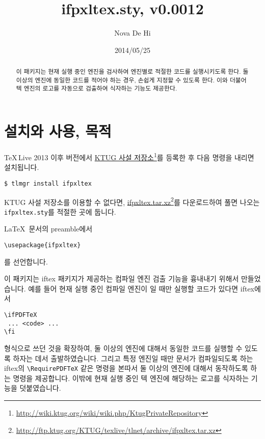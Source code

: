 \documentclass[b5paper,adjustmath,nanum]{oblivoir}
\begin{document}
\title{ifpxltex.sty, v0.0012}
\author{Nova De Hi}
\date{2014/05/25}

\maketitle

\begin{abstract}
이 패키지는 현재 실행 중인 
엔진을 검사하여 엔진별로 적절한 코드를 실행시키도록 한다.
둘 이상의 엔진에 동일한 코드를 적어야 하는 경우, 손쉽게 지정할 수 있도록 한다.
이와 더불어 텍 엔진의 로고를 자동으로 검출하여 식자하는 기능도 제공한다.
\end{abstract}

\section{설치와 사용, 목적}

\TeX\,Live 2013 이후 버전에서 \href{http://wiki.ktug.org/wiki/wiki.php/KtugPrivateRepository}{KTUG 사설 저장소}\footnote{\url{http://wiki.ktug.org/wiki/wiki.php/KtugPrivateRepository}}를 등록한 후
다음 명령을 내리면 설치됩니다.
\begin{verbatim}
$ tlmgr install ifpxltex
\end{verbatim}

KTUG 사설 저장소를 이용할 수 없다면, \href{http://ftp.ktug.org/KTUG/texlive/tlnet/archive/ifpxltex.tar.xz}{\ttfamily ifpxltex.tar.xz}\footnote{\url{http://ftp.ktug.org/KTUG/texlive/tlnet/archive/ifpxltex.tar.xz}}를 다운로드하여 풀면 나오는 \texttt{ifpxltex.sty}를 적절한 곳에 둡니다.

\LaTeX\ 문서의 preamble에서 
\begin{verbatim}
\usepackage{ifpxltex}
\end{verbatim}
를 선언합니다.

\bigskip

이 패키지는 \textsf{iftex} 패키지가 제공하는 컴파일 엔진 검출 기능을 흉내내기 위해서 만들었습니다. 예를 들어 현재 실행 중인 컴파일 엔진이 \pxlThisTeX[pdfTeX]일 때만 실행할 코드가 있다면 \textsf{iftex}에서
\begin{verbatim}
\ifPDFTeX
 ... <code> ...
\fi
\end{verbatim}
형식으로 쓰던 것을 확장하여, 둘 이상의 엔진에 대해서 동일한 코드를 실행할 수 있도록 하자는 데서 출발하였습니다. 그리고 특정 엔진일 때만 문서가 컴파일되도록 하는 \textsf{iftex}의 \verb|\RequirePDFTeX| 같은 명령을 본따서 둘 이상의 엔진에 대해서 동작하도록 하는 명령을 제공합니다.
이밖에 현재 실행 중인 텍 엔진에 해당하는 로고를 식자하는 기능을 덧붙였습니다.
\end{document}

